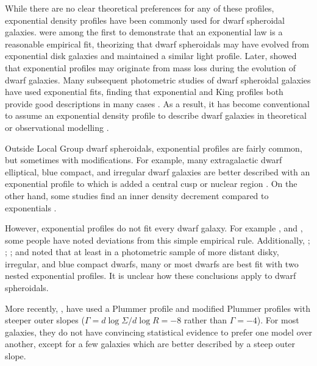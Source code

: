 While there are no clear theoretical preferences for any of these
profiles, exponential density profiles have been commonly used for dwarf
spheroidal galaxies. \citet{faber+lin1983} were among the first to
demonstrate that an exponential law is a reasonable empirical fit,
theorizing that dwarf spheroidals may have evolved from exponential disk
galaxies and maintained a similar light profile. Later,
\citet{read+gilmore2005} showed that exponential profiles may originate
from mass loss during the evolution of dwarf galaxies. Many subsequent
photometric studies of dwarf spheroidal galaxies have used exponential
fits, finding that exponential and King profiles both provide good
descriptions in many cases
\citep{binggeli+sandage+tarenghi1984, mateo1998, mcconnachie+irwin2006, cicuendez+2018}.
As a result, it has become conventional to assume an exponential density
profile to describe dwarf galaxies in theoretical or observational
modelling
\citep[e.g.,][]{martin+2016, MV2020a, battaglia+2022, kowalczyk+2013}.

Outside Local Group dwarf spheroidals, exponential profiles are fairly
common, but sometimes with modifications. For example, many
extragalactic dwarf elliptical, blue compact, and irregular dwarf
galaxies are better described with an exponential profile to which is
added a central cusp or nuclear region
\citep{caldwell+bothun1987, noeske+2003}. On the other hand, some
studies find an inner density decrement compared to exponentials
\citep[e.g.,][]{caldwell+1992, makarov+2012}.

However, exponential profiles do not fit every dwarf galaxy. For example
\citet{aparicio+1997}, and \citet[for Coma cluster dwarf
ellipticals]{graham+guzman2003}, some people have noted deviations from
this simple empirical rule. Additionally, \citet{hunter+elmegreen2006};
\citet{herrmann+hunter+elmegreen2013};
\citet{herrmann+hunter+elmegreen2016}; and \citet{lee+2018} noted that
at least in a photometric sample of more distant disky, irregular, and
blue compact dwarfs, many or most dwarfs are best fit with two nested
exponential profiles. It is unclear how these conclusions apply to dwarf
spheroidals.

More recently, \citet{moskowitz+walker2020}, have used a Plummer profile
and modified Plummer profiles with steeper outer slopes
(\(\Gamma = d\log \Sigma / d \log R = -8\) rather than \(\Gamma = -4\)).
For most galaxies, they do not have convincing statistical evidence to
prefer one model over another, except for a few galaxies which are
better described by a steep outer slope.

